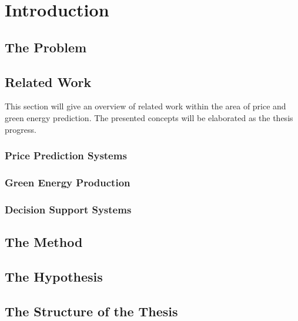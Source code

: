\documentclass[twoside,11pt,openright]{report}
\begin{document}
\tableofcontents
{}
\setcounter{secnumdepth}{2}


\chapter{Introduction}
\label{ch:intro}
\section{The Problem}

\section{Related Work}
This section will give an overview of related work within the area of price and green energy prediction. The presented concepts will be elaborated as the thesis progress.
\subsection{Price Prediction Systems}


\subsection{Green Energy Production}
\label{sec:greeEnergyProductionIntroduction}



\subsection{Decision Support Systems}


\section{The Method}


\section{The Hypothesis}
\label{sec:theHypothesis}


\newpage
\section{The Structure of the Thesis}
\label{sec:structureOfTheThesis}

\end{document}
